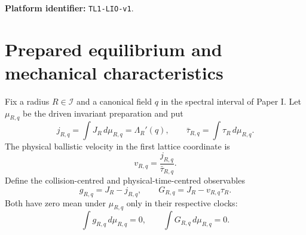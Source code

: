 
\begin{abstract}
We derive the physical-time stochastic limit of the actual lattice displacement
in the current-prepared periodic Sinai billiards of Paper I.  The microscopic
orbit is deterministic and the only probability is the canonical equilibrium
preparation selected by the Liouville current large deviation.  A nonzero
prepared current creates ballistic transport.  The diffusive variable is
therefore the comoving displacement, and its collision observable is not
$J-j$ but the clock-corrected mechanical increment
\[
 G=J-v\tau,\qquad v=\frac{j}{\bar\tau}.
\]
This correction closes the current--roof covariance interface that is lost if
one divides the collision variance by the mean roof mechanically.

Using the twisted Lorentz spectral packet, we prove a joint almost-sure
invariance principle for cell current and actual free-flight time, identify the
physical drift and variance through a pressure-root formula, and obtain a
ballistic law of large numbers plus Brownian fluctuations in the comoving
frame.  Spectral Bernstein estimates yield exponential control of the random
collision window at a fixed physical horizon.  These estimates are precisely
strong enough for the nonlinear free-energy DPP in Paper III.
\end{abstract}
\maketitle
\noindent\textbf{Platform identifier:} \texttt{TL1-LIO-v1}.

\tableofcontents

\section{Prepared equilibrium and mechanical characteristics}\label{sec:data}
Fix a radius $R\in\mathcal I$ and a canonical field $q$ in the spectral
interval of Paper I.  Let $\mu_{R,q}$ be the driven invariant preparation and
put
\[
 j_{R,q}=\int J_R\,d\mu_{R,q}=\Lambda_R'(q),
 \qquad
 \bar\tau_{R,q}=\int\tau_R\,d\mu_{R,q}.
\]
The physical ballistic velocity in the first lattice coordinate is
\[
 v_{R,q}=\frac{j_{R,q}}{\bar\tau_{R,q}}.
\]
Define the collision-centred and physical-time-centred observables
\[
 g_{R,q}=J_R-j_{R,q},
 \qquad
 G_{R,q}=J_R-v_{R,q}\tau_R.
\]
Both have zero mean under $\mu_{R,q}$ only in their respective clocks:
\[
 \int g_{R,q}\,d\mu_{R,q}=0,
 \qquad
 \int G_{R,q}\,d\mu_{R,q}=0.
\]

